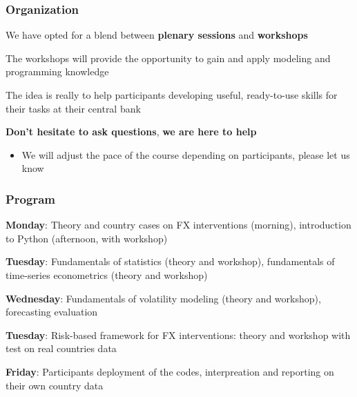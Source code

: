 \documentclass{beamer}
\newenvironment{wideitemize}{\itemize\addtolength{\itemsep}{10pt}}{\enditemize}
\begin{document}
\begin{frame}
  \frametitle{Organization}

  \begin{wideitemize}
    \item We have opted for a blend between \textbf{plenary sessions} and \textbf{workshops}
    \item The workshops will provide the opportunity to gain and apply modeling and programming knowledge
    \item The idea is really to help participants developing useful, ready-to-use skills for their tasks at their central bank
    \item \textbf{Don't hesitate to ask questions}, \textbf{we are here to help}
      \begin{itemize}
      \item We will adjust the pace of the course depending on participants, please let us know
      \end{itemize}
  \end{wideitemize}
  
\end{frame}


\begin{frame}
  \frametitle{Program}
  \begin{wideitemize}
    \item \textbf{Monday}: Theory and country cases on FX interventions (morning), introduction to Python (afternoon, with workshop)
    \item \textbf{Tuesday}: Fundamentals of statistics (theory and workshop), fundamentals of time-series econometrics (theory and workshop)
    \item \textbf{Wednesday}: Fundamentals of volatility modeling (theory and workshop), forecasting evaluation 
    \item \textbf{Tuesday}: Risk-based framework for FX interventions: theory and workshop with test on real countries data
    \item \textbf{Friday}: Participants deployment of the codes, interpreation and reporting on their own country data
  \end{wideitemize}
  
\end{frame}



\end{document}
